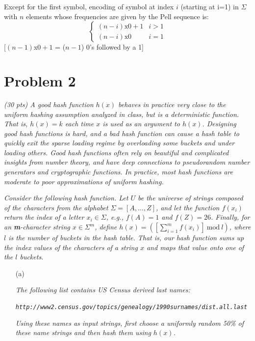 \documentclass[12pt]{article} \setlength{\oddsidemargin}{0in}
\begin{document}
{\begin{enumerate}
    Except for the first symbol, encoding of symbol at index $i$ (starting at i=1) in $\Sigma$ with $n$ elements whose frequencies are given by the Pell sequence is: 
        \[ \begin{cases} 
          (n-i)\text{x}0 + 1 & i > 1 \\
          (n-i)\text{x}0 & i = 1 
        \end{cases}
    \] [$(n-1)$x$0+1$ = ($n-1$) 0's followed by a 1] \\
  \end{enumerate}

  \newpage

  \section*{Problem 2}

  \textit{(30 pts) A good hash function $h(x)$ behaves in practice very close to the uniform hashing
assumption analyzed in class, but is a deterministic function. That is, $h(x) = k$ each
time $x$ is used as an argument to $h(x)$. Designing good hash functions is hard, and a
bad hash function can cause a hash table to quickly exit the sparse loading regime by
overloading some buckets and under loading others. Good hash functions often rely
on beautiful and complicated insights from number theory, and have deep connections
to pseudorandom number generators and cryptographic functions. In practice, most
hash functions are moderate to poor approximations of uniform hashing.}

\textit{Consider the following hash function. Let $U$ be the universe of strings composed of the
characters from the alphabet $\Sigma = [A, \dots ,Z]$, and let the function $f(x_i)$ return the index
of a letter $x_i \in \Sigma$, e.g., $f(A)=1$ and $f(Z)=26$. Finally, for an \textbf{m}-character string
$x \in \Sigma^m$, define $h(x)=([\sum_{i=1}^m f(x_i)] \ \text{mod} \ l)$, where $l$ is the number of buckets in the hash table. That is, our hash function sums up the index values of the characters of a
string $x$ and maps that value onto one of the $l$ buckets.}
\newpage
\begin{enumerate}
\item[(a)]{\textit{The following list contains US Census derived last names:}
    
    \textit{\texttt{http://www2.census.gov/topics/genealogy/1990surnames/dist.all.last}}

    \textit{Using these names as input strings, first choose a uniformly random 50\% of these
      name strings and then hash them using $h(x)$.}

}
\end{enumerate}}
\end{document}
